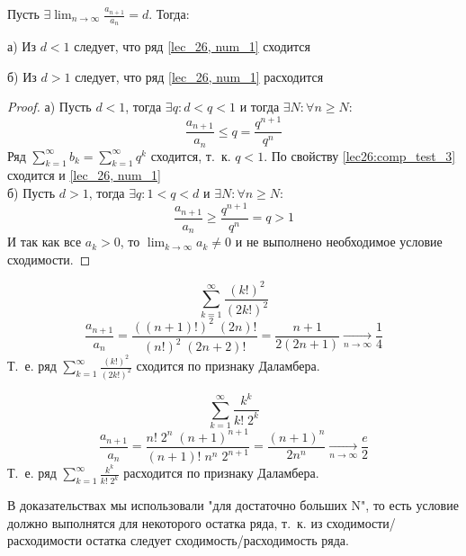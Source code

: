 \documentclass[../../main.tex]{subfiles}
\begin{document}
	\begin{thm}\label{lec27:dalamber}
		
		Пусть $\exists \lim_{n \to \infty } \frac{a_{n+1}}{a_n} = d$. Тогда:
		
		а) Из $d < 1$ следует, что ряд \ref{lec_26, num_1} сходится
		
		б) Из $d > 1$ следует, что ряд \ref{lec_26, num_1} расходится
		
		\begin{proof}
			
			а) Пусть $d < 1$, тогда $\exists q : d < q < 1$  и тогда $\exists N : 
			\forall n \geq N$:	
			\[ \frac{a_{n+1}}{a_n} \leq q = \frac{q^{n+1}}{q^n}   \]
			Ряд $\sum_{k=1}^{\infty} b_k = \sum_{k=1}^{\infty} q^k$ сходится, т.~к. 
			$q<1$. По свойству \ref{lec26:comp_test_3} сходится и \ref{lec_26, num_1} \\
			б) Пусть $d > 1$, тогда $\exists q : 1 < q < d $ и $\exists N : \forall n 
			\geq N$:
			\[  \frac{a_{n+1}}{a_n} \geq \frac{q^{n+1}}{q^n} = q > 1    \]
			И так как все $a_k > 0$, то $\lim_{k \to \infty} a_k \neq 0 $ и не 
			выполнено необходимое условие сходимости.
		\end{proof}
	\end{thm}			
	
	\begin{example}
		\[ \sum_{k = 1}^{\infty} \frac{(k!)^2}{(2k!)^2}    \]
		\[ \frac{a_{n+1}}{a_n} = \frac{((n+1)!)^2 \; (2n)!}{(n!)^2 \; (2n+2)!} = 
		\frac{n+1}{2(2n+1)}  \underset{n \rightarrow \infty} {\longrightarrow} 
		\frac{1}{4}    \]
		Т.~е. ряд $\sum_{k = 1}^{\infty} \frac{(k!)^2}{(2k!)^2}$ сходится по 
		признаку Даламбера.
		
	\end{example}

	\begin{example}
		\[  \sum_{k = 1}^{\infty} \frac{k^k}{k! \; 2^k} \]
		\[ \frac{a_{n+1}}{a_n} = \frac{n! \; 2^n \; (n+1)^{n+1}}{(n+1)! \; n^n \; 
		2^{n+1}} = \frac{(n+1)^{n}}{2 n^n } \underset{n \rightarrow \infty} 
		{\longrightarrow}  \frac{e}{2} \]
		Т.~е. ряд $\sum_{k = 1}^{\infty} \frac{k^k}{k! \; 2^k}$ расходится по 
		признаку Даламбера.
	\end{example}	

	\begin{remark} В доказательствах мы использовали "для достаточно больших N", 
	то есть условие должно выполнятся для некоторого остатка ряда, т.~к. из 
	сходимости/расходимости остатка следует сходимость/расходимость ряда.
		
	\end{remark}	
\end{document}
